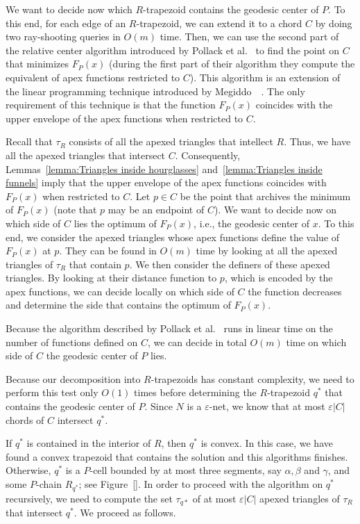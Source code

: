 \documentclass[a4paper,UKenglish]{lipics}
\newcommand{\F}[2]{\ensuremath{F_{\scriptscriptstyle #1}(#2)}}
\begin{document}
We want to decide now which $R$-trapezoid contains the geodesic center of $P$. 
To this end, for each edge of an $R$-trapezoid, we can extend it to a chord $C$ by doing two ray-shooting queries in $O(m)$ time. Then, we can use the second part of the relative center algorithm introduced by Pollack et al.~\cite[Section~3]{pollackComputingCenter} to find the point on $C$ that minimizes $\F{P}{x}$ (during the first part of their algorithm they compute the equivalent of apex functions restricted to $C$).
This algorithm is an extension of the linear programming technique introduced by Megiddo~~\cite{megiddo1982linear}. 
The only requirement of this technique is that the function $\F{P}{x}$ coincides with the upper envelope of the apex functions when restricted to $C$.

Recall that $\tau_R$ consists of all the apexed triangles that intellect $R$. 
Thus, we have all the apexed triangles that intersect $C$. Consequently, Lemmas~\ref{lemma:Triangles inside hourglasses} and~\ref{lemma:Triangles inside funnels} imply that the upper envelope of the apex functions coincides with $\F{P}{x}$ when restricted to $C$.
Let $p\in C$ be the point that archives the minimum of $\F{P}{x}$ (note that $p$ may be an endpoint of $C$). 
We want to decide now on which side of $C$ lies the optimum of $\F{P}{x}$, i.e., the geodesic center of $x$. 
To this end, we consider the apexed triangles whose apex functions define the value of $\F{P}{x}$ at $p$. 
They can be found in $O(m)$ time by looking at all the apexed triangles of $\tau_R$ that contain $p$. 
We then consider the definers of these apexed triangles. By looking at their distance function to $p$, which is encoded by the apex functions, we can decide locally on which side of $C$ the function decreases and determine the side that contains the optimum of $\F{P}{x}$.

Because the algorithm described by Pollack et al.~\cite[Section~3]{pollackComputingCenter} runs in linear time on the number of functions defined on $C$, we can decide in total $O(m)$ time on which side of $C$ the geodesic center of $P$ lies. 

Because our decomposition into $R$-trapezoids has constant complexity, we need to perform this test only $O(1)$ times before determining the $R$-trapezoid $q^*$ that contains the geodesic center of $P$. 
Since $N$ is a $\varepsilon$-net, we know that at most $\varepsilon |C|$ chords of $C$ intersect $q^*$.

If $q^*$ is contained in the interior of $R$, then $q^*$ is convex. In this case, we have found a convex trapezoid that contains the solution and this algorithms finishes. Otherwise, $q^*$ is a $P$-cell bounded by at most three segments, say $\alpha, \beta$ and $\gamma$, and some $P$-chain $R_{q^*}$; see Figure~\ref{}. 
In order to proceed with the algorithm on  $q^*$ recursively, we need to compute the set $\tau_{q*}$ of at most $\varepsilon |C|$ apexed triangles of $\tau_R$ that intersect $q^*$. We proceed as follows.
\end{document}
